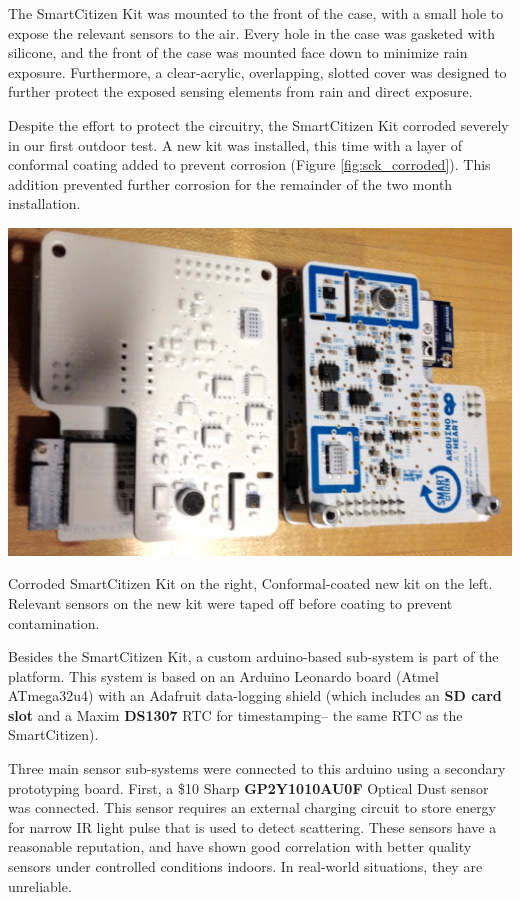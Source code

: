 The SmartCitizen Kit was mounted to the front of the case, with a small hole to expose the relevant sensors to the air.  Every hole in the case was gasketed with silicone, and the front of the case was mounted face down to minimize rain exposure.  Furthermore, a clear-acrylic, overlapping, slotted cover was designed to further protect the exposed sensing elements from rain and direct exposure.  

Despite the effort to protect the circuitry, the SmartCitizen Kit corroded severely in our first outdoor test.  A new kit was installed, this time with a layer of conformal coating added to prevent corrosion (Figure \ref{fig:sck_corroded}).  This addition prevented further corrosion for the remainder of the two month installation.    

\begin{marginfigure}
 	\includegraphics[width=\textwidth]{visuals/sck_conformal}               
 	 \caption{Corroded SmartCitizen Kit on the right, Conformal-coated new kit on the left.  Relevant sensors on the new kit were taped off before coating to prevent contamination.}
  	\label{fig:sck_corroded}
\end{marginfigure}

Besides the SmartCitizen Kit, a custom arduino-based sub-system is part of the platform.  This system is based on an Arduino Leonardo board (Atmel ATmega32u4) with an Adafruit data-logging shield (which includes an \textbf{SD card slot} and a Maxim \textbf{DS1307} RTC for timestamping-- the same RTC as the SmartCitizen). 

Three main sensor sub-systems were connected to this arduino using a secondary prototyping board.  First, a \$10 Sharp \textbf{GP2Y1010AU0F} Optical Dust sensor was connected.  This sensor requires an external charging circuit to store energy for narrow IR light pulse that is used to detect scattering.  These sensors have a reasonable reputation, and have shown good correlation with better quality sensors under controlled conditions indoors.  In real-world situations, they are unreliable.  

